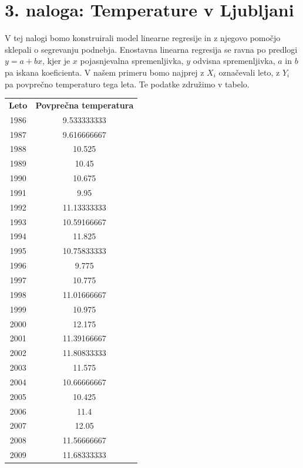 \documentclass{article}
\begin{document}
\section*{3. naloga: Temperature v Ljubljani}
V tej nalogi bomo konstruirali model linearne regresije in z njegovo pomočjo sklepali o segrevanju 
podnebja. Enostavna linearna regresija se ravna po predlogi $y = a + b x$, kjer je $x$ pojasnjevalna 
spremenljivka, $y$ odvisna spremenljivka, $a$ in $b$ pa iskana koeficienta. V našem primeru bomo najprej
z $X_i$ označevali leto, z $Y_i$ pa povprečno temperaturo tega leta. Te podatke združimo v tabelo.
\begin{table}[H]
    \centering
    \begin{tabular}{c c}
        \bf{Leto}  &	\bf{Povprečna temperatura}   \\
        1986  & 	9.533333333     \\
        1987  & 	9.616666667     \\
        1988  & 	10.525      \\
        1989  & 	10.45       \\
        1990  & 	10.675      \\
        1991  & 	9.95        \\
        1992  & 	11.13333333     \\
        1993  & 	10.59166667     \\
        1994  & 	11.825      \\
        1995  & 	10.75833333     \\
        1996  & 	9.775       \\
        1997  & 	10.775      \\
        1998  & 	11.01666667     \\
        1999  & 	10.975      \\
        2000  & 	12.175      \\
        2001  & 	11.39166667     \\
        2002  & 	11.80833333     \\
        2003  & 	11.575      \\
        2004  & 	10.66666667     \\
        2005  & 	10.425      \\
        2006  & 	11.4        \\
        2007  & 	12.05       \\
        2008  & 	11.56666667     \\
        2009  & 	11.68333333     \\

\end{tabular}
\end{table}
\end{document}
